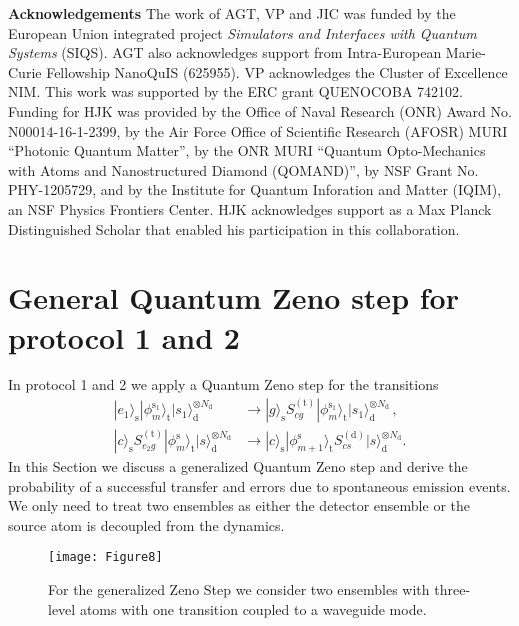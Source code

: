 \documentclass[twocolumn,pra,aps,superscriptaddress,showpacs]{revtex4-1}
\newcommand{\ket}[1]{|#1\rangle}
\newcommand{\rs}{\mathrm{s}}
\newcommand{\rd}{\mathrm{d}}
\newcommand{\rt}{\mathrm{t}}
\begin{document}
\begin{acknowledgements}
	\textbf{Acknowledgements}
	The work of AGT, VP and JIC was funded by the European Union integrated project \emph{Simulators and Interfaces with Quantum Systems} (SIQS).
	AGT also acknowledges support from Intra-European Marie-Curie Fellowship NanoQuIS (625955).
	VP acknowledges the Cluster of Excellence NIM.
	This work was supported by the ERC grant QUENOCOBA 742102. 
	Funding for HJK was provided by the Office of Naval Research (ONR) Award No. N00014-16-1-2399, by the Air Force Office of Scientific Research (AFOSR) MURI “Photonic Quantum Matter”, by the ONR MURI “Quantum Opto-Mechanics with Atoms and Nanostructured Diamond (QOMAND)”, by NSF Grant No. PHY-1205729, and by the Institute for Quantum Inforation and Matter (IQIM), an NSF Physics Frontiers Center. HJK acknowledges support as a Max Planck Distinguished Scholar that enabled his participation in this collaboration.
\end{acknowledgements}

%


\appendix
\section{General Quantum Zeno step for protocol 1 and 2}\label{appendix:zeno}

In protocol 1 and 2 we apply a Quantum Zeno step for the transitions 
%
\begin{align}
	\ket{e_1}_\rs \ket{\phi_m^{\rs_1}}_\rt \ket{s_1}^{\otimes N_\rd}_\rd
	&\rightarrow
	\ket{g}_\rs S_{cg}^{(\rt)}\ket{\phi_m^{\rs_1}}_\rt \ket{s_1}^{\otimes N_\rd}_\rd\,,\\
	\ket{c}_\rs S_{e_2 g}^{(\rt)}\ket{\phi_m^{\rs}}_\rt \ket{s}^{\otimes N_\rd}_\rd
	&\rightarrow
	\ket{c}_\rs \ket{\phi_{m+1}^{\rs}}_\rt S_{cs}^{(\rd)} \ket{s}^{\otimes N_\rd}_\rd.
\end{align}
%
In this Section we discuss a generalized Quantum Zeno step and derive the probability of a successful transfer and errors due to spontaneous emission events. We only need to treat two ensembles as either the detector ensemble or the source atom is decoupled from the dynamics.

\begin{figure}[t]
	\centering
	\texttt{[image: Figure8]}
	\caption{ For the generalized Zeno Step we consider two ensembles with three-level atoms with one transition coupled to a waveguide mode. }
	
	\label{fig:Zeno_General}
\end{figure}
\end{document}
